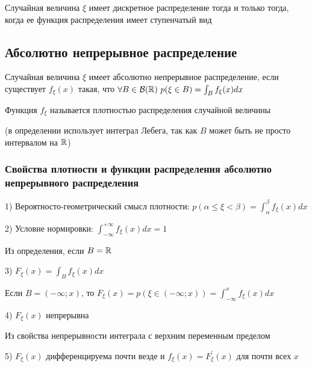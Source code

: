 \documentclass[12pt]{article}
\begin{document}
    \begin{MyTheorem}
        \Ths Случайная величина $\xi$ имеет дискретное распределение тогда и только тогда, когда ее функция распределения имеет ступенчатый вид
    \end{MyTheorem}

    \subsection{Абсолютно непрерывное распределение}

    \Def Случайная величина $\xi$ имеет абсолютно непрерывное распределение, если существует $f_\xi(x)$ такая, что $\forall B \in \mathcal{B}(\mathbb{R})
    \ p(\xi \in B) = \int_B f_\xi(x)dx$

    Функция $f_\xi$ называется плотностью распределения случайной величины

    (в определении использует интеграл Лебега, так как $B$ может быть не просто интервалом на $\mathbb{R}$)

    \subsubsection{Свойства плотности и функции распределения абсолютно непрерывного распределения}

    1) Вероятносто-геометрический смысл плотности: $p(\alpha \leq \xi < \beta) = \int_{\alpha}^\beta f_\xi(x) dx$

    2) Условие нормировки: $\int_{-\infty}^{+\infty} f_\xi(x)dx = 1$

    \begin{MyProof}
        Из определения, если $B = \mathbb{R}$
    \end{MyProof}

    3) $F_\xi(x) = \int_B f_\xi(x)dx$

    \begin{MyProof}
        Если $B = (-\infty; x)$, то $F_\xi(x) = p(\xi \in (-\infty; x)) = \int_{-\infty}^x f_\xi(x)dx$
    \end{MyProof}

    4) $F_\xi(x)$ непрерывна 
    
    \begin{MyProof}
        Из свойства непрерывности интеграла с верхним переменным пределом
    \end{MyProof}

    5) $F_\xi(x)$ дифференцируема почти везде и $f_\xi(x) = F^\prime_\xi(x)$ для почти всех $x$
    
\end{document}
